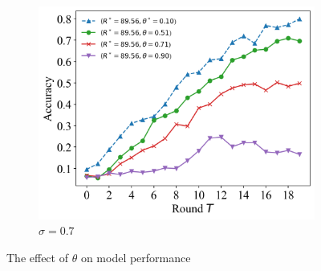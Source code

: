 \documentclass{article}
\theoremstyle{plain}
\theoremstyle{definition}
\theoremstyle{remark}
\begin{document}
\begin{figure}
\begin{subfigure}{0.31\textwidth}
		\includegraphics[width=\textwidth]{figures/figure_65_C.png}
    \caption{$\sigma=0.7$}
	\end{subfigure}
	\caption{The effect of $\theta$ on model performance}
\end{figure}
\end{document}
